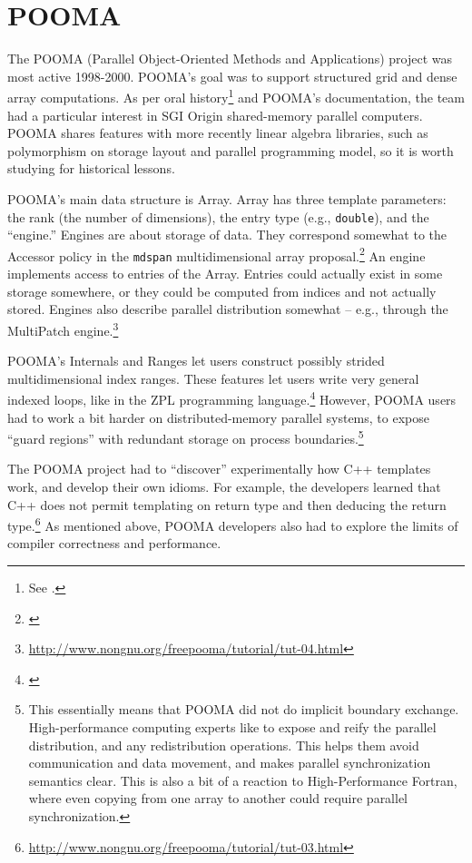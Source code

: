 \section{POOMA}

The POOMA (Parallel Object-Oriented Methods and Applications) project
was most active 1998-2000. POOMA's goal was to support structured grid
and dense array computations. As per oral history\footnote{See
  \cite{hoemmen2018history}.} and POOMA's documentation, the team had
a particular interest in SGI Origin shared-memory parallel
computers. POOMA shares features with more recently linear algebra
libraries, such as polymorphism on storage layout and parallel
programming model, so it is worth studying for historical lessons.

POOMA's main data structure is Array. Array has three template parameters:
the rank (the number of dimensions),
the entry type (e.g., \texttt{double}),
and the ``engine.''
Engines are about storage of data.
They correspond somewhat to the Accessor policy
in the \texttt{mdspan} multidimensional array proposal.\footnote{\cite{P0009r8}}
An engine implements access to entries of the Array.
Entries could actually exist in some storage somewhere,
or they could be computed from indices and not actually stored. Engines also
describe parallel distribution somewhat -- e.g., through the MultiPatch engine.\footnote{\url{http://www.nongnu.org/freepooma/tutorial/tut-04.html}}

POOMA's Internals and Ranges let users construct possibly strided
multidimensional index ranges. These features let users write very general
indexed loops, like in the ZPL programming language.\footnote{\cite{Chamberlain1998}}
However, POOMA users had to work a bit harder on distributed-memory parallel
systems, to expose ``guard regions'' with redundant storage on process boundaries.\footnote{This essentially means that POOMA did not do implicit boundary
  exchange.  High-performance computing experts like to expose and reify the
  parallel distribution, and any redistribution operations. This helps them
  avoid communication and data movement, and makes parallel synchronization
  semantics clear.  This is also a bit of a reaction to High-Performance
  Fortran, where even copying from one array to another could require parallel
  synchronization.
}

The POOMA project had to ``discover'' experimentally how C++ templates work, and
develop their own idioms. For example, the developers learned that C++
does not permit templating on return type and then deducing the return type.\footnote{\url{http://www.nongnu.org/freepooma/tutorial/tut-03.html}}
As mentioned above, POOMA developers also had to explore the limits of compiler
correctness and performance.

